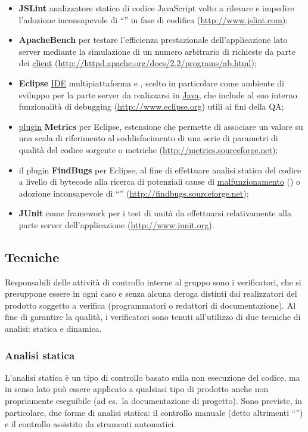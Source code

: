 {\begin{itemize}
  \item \textbf{JSLint} analizzatore statico di codice JavaScript volto a rilevare e impedire l'adozione inconsapevole di ``\underline{}'' in fase di codifica (\url{http://www.jslint.com});
  \item \textbf{ApacheBench} per testare l'efficienza prestazionale dell'applicazione lato server mediante la simulazione di un numero arbitrario di richieste da parte dei \underline{client} (\url{http://httpd.apache.org/docs/2.2/programs/ab.html});
  \item \textbf{Eclipse} \underline{IDE} multipiattaforma e , scelto in particolare come ambiente di sviluppo per la parte server da realizzarsi in \underline{Java}, che include al suo interno funzionalità di debugging (\url{http://www.eclipse.org}) utili ai fini della QA;
  \item \underline{plugin} \textbf{Metrics} per Eclipse, estensione che permette di associare un valore su una scala di riferimento al soddisfacimento di una serie di parametri di qualità del codice sorgente o metriche (\url{http://metrics.sourceforge.net});
  \item il plugin \textbf{FindBugs} per Eclipse, al fine di effettuare analisi statica del codice a livello di bytecode alla ricerca di potenziali cause di \underline{malfunzionamento} () o adozione inconsapevole di ``'' (\url{http://findbugs.sourceforge.net});
  \item \textbf{JUnit} come framework per i test di unità da effettuarsi relativamente alla parte server dell'applicazione (\url{http://www.junit.org}).
\end{itemize}

\subsection{Tecniche}
Responsabili delle attività di controllo interne al gruppo sono i verificatori, che si presuppone essere in ogni caso e senza alcuna deroga distinti dai realizzatori del prodotto soggetto a verifica (programmatori o redattori di documentazione). Al fine di garantire la qualità, i verificatori sono tenuti all'utilizzo di due tecniche di analisi: statica e dinamica.

\subsubsection{Analisi statica}
\label{analisi_statica}
L'analisi statica è un tipo di controllo basato sulla non esecuzione del codice, ma in senso lato può essere applicato a qualsiasi tipo di prodotto anche non propriamente eseguibile (ad es.~la documentazione di progetto). Sono previste, in particolare, due forme di analisi statica: il controllo manuale (detto altrimenti ``'') e il controllo assistito da strumenti automatici.

}
